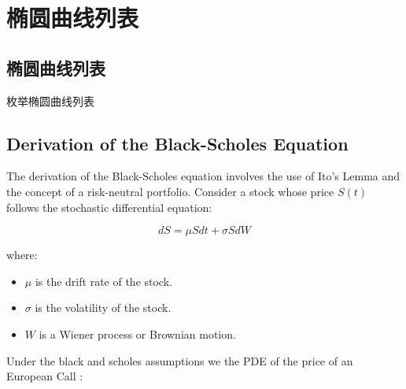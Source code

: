 \documentclass[../Main.tex]{subfiles}
\begin{document}
\chapter{椭圆曲线列表}


\section{椭圆曲线列表}
枚举椭圆曲线列表
\begin{enumerate}

\end{enumerate}

\section{Derivation of the Black-Scholes Equation}

The derivation of the Black-Scholes equation involves the use of Ito's Lemma and the concept of a risk-neutral portfolio. Consider a stock whose price \( S(t) \) follows the stochastic differential equation:

\begin{equation}
    dS = \mu S dt + \sigma S dW
\end{equation}

where:
\begin{itemize}
    \item \( \mu \) is the drift rate of the stock.
    \item \( \sigma \) is the volatility of the stock.
    \item \( W \) is a Wiener process or Brownian motion.
\end{itemize}


Under the black and scholes assumptions we the PDE of the price of an European Call :
\end{document}
